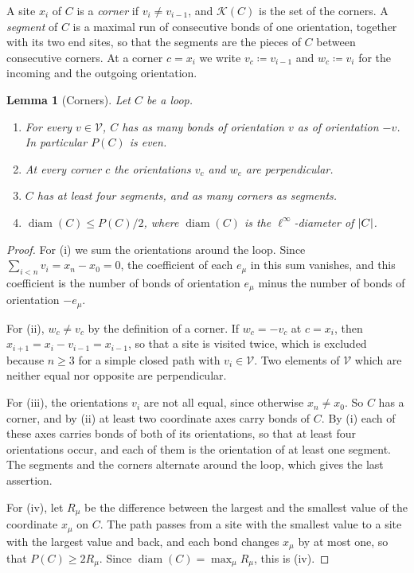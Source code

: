 \documentclass[11pt]{preprint}
\newcommand{\diam}{\operatorname{diam}}
\DeclarePairedDelimiter{\abs}{\lvert}{\rvert}
\numberwithin{equation}{section}
\newtheorem{lemma}[theorem]{Lemma}
\theoremstyle{definition}
\theoremstyle{remark}
\theoremstyle{plain}
\begin{document}
A site $x_i$ of $C$ is a \emph{corner} if $v_i \neq v_{i-1}$, and $\mathcal K(C)$ is the set of the corners. A \emph{segment} of $C$ is a maximal run of consecutive bonds of one orientation, together with its two end sites, so that the segments are the pieces of $C$ between consecutive corners. At a corner $c = x_i$ we write $v_c \coloneqq v_{i-1}$ and $w_c \coloneqq v_i$ for the incoming and the outgoing orientation.

\begin{lemma}[Corners]\label{lem:corners}
Let $C$ be a loop.
\begin{enumerate}[label=(\roman*)]
\item For every $v \in \mathcal V$, $C$ has as many bonds of orientation $v$ as of orientation $-v$. In particular $P(C)$ is even.
\item At every corner $c$ the orientations $v_c$ and $w_c$ are perpendicular.
\item $C$ has at least four segments, and as many corners as segments.
\item $\diam(C) \leq P(C)/2$, where $\diam(C)$ is the $\ell^\infty$-diameter of $\abs{C}$.
\end{enumerate}
\end{lemma}

\begin{proof}
For (i) we sum the orientations around the loop. Since $\sum_{i<n}v_i = x_n - x_0 = 0$, the coefficient of each $e_\mu$ in this sum vanishes, and this coefficient is the number of bonds of orientation $e_\mu$ minus the number of bonds of orientation $-e_\mu$.

For (ii), $w_c \neq v_c$ by the definition of a corner. If $w_c = -v_c$ at $c = x_i$, then $x_{i+1} = x_i - v_{i-1} = x_{i-1}$, so that a site is visited twice, which is excluded because $n \geq 3$ for a simple closed path with $v_i \in \mathcal V$. Two elements of $\mathcal V$ which are neither equal nor opposite are perpendicular.

For (iii), the orientations $v_i$ are not all equal, since otherwise $x_n \neq x_0$. So $C$ has a corner, and by (ii) at least two coordinate axes carry bonds of $C$. By (i) each of these axes carries bonds of both of its orientations, so that at least four orientations occur, and each of them is the orientation of at least one segment. The segments and the corners alternate around the loop, which gives the last assertion.

For (iv), let $R_\mu$ be the difference between the largest and the smallest value of the coordinate $x_\mu$ on $C$. The path passes from a site with the smallest value to a site with the largest value and back, and each bond changes $x_\mu$ by at most one, so that $P(C) \geq 2R_\mu$. Since $\diam(C) = \max_\mu R_\mu$, this is (iv).
\end{proof}
\end{document}
